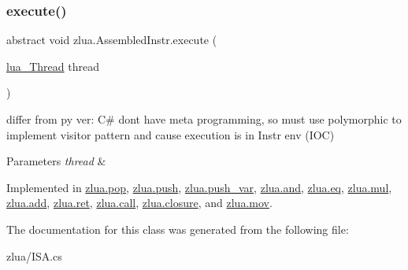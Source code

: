 \subsubsection{\texorpdfstring{execute()}{execute()}}
{\footnotesize\ttfamily abstract void zlua.\+Assembled\+Instr.\+execute (\begin{DoxyParamCaption}\item[{\mbox{\hyperlink{classzlua_1_1lua___thread}{lua\+\_\+\+Thread}}}]{thread }\end{DoxyParamCaption})\hspace{0.3cm}{\ttfamily [pure virtual]}}



differ from py ver\+: C\# dont have meta programming, so must use polymorphic to implement visitor pattern and cause execution is in Instr env (I\+OC) 


\begin{DoxyParams}{Parameters}
{\em thread} & \\
\hline
\end{DoxyParams}


Implemented in \mbox{\hyperlink{classzlua_1_1pop_a72cea959966aec69448d61be5bfc322c}{zlua.\+pop}}, \mbox{\hyperlink{classzlua_1_1push_ab3284599ae65d600d21622bd407405e8}{zlua.\+push}}, \mbox{\hyperlink{classzlua_1_1push__var_a854bc287123c636f0c3d86735938879f}{zlua.\+push\+\_\+var}}, \mbox{\hyperlink{classzlua_1_1and_ad1ef9d7bf03b778753264a15bbd6ac04}{zlua.\+and}}, \mbox{\hyperlink{classzlua_1_1eq_a802b2377436b97b137b50c36b2867d29}{zlua.\+eq}}, \mbox{\hyperlink{classzlua_1_1mul_a22002ab020aaabcf37eddae16b6ba10a}{zlua.\+mul}}, \mbox{\hyperlink{classzlua_1_1add_a7a1a96e612bf700e73a640d4c4080179}{zlua.\+add}}, \mbox{\hyperlink{classzlua_1_1ret_a0c334b18dbe8e21c26aa785269b29253}{zlua.\+ret}}, \mbox{\hyperlink{classzlua_1_1call_a152a4ccd3e77e5172f97283a50d6ba45}{zlua.\+call}}, \mbox{\hyperlink{classzlua_1_1closure_aa569159f1b1106362a86951524e96bce}{zlua.\+closure}}, and \mbox{\hyperlink{classzlua_1_1mov_a729d173bb798f765ed20aabcfaf2f63c}{zlua.\+mov}}.



The documentation for this class was generated from the following file\+:\begin{DoxyCompactItemize}
\item 
zlua/I\+S\+A.\+cs\end{DoxyCompactItemize}
